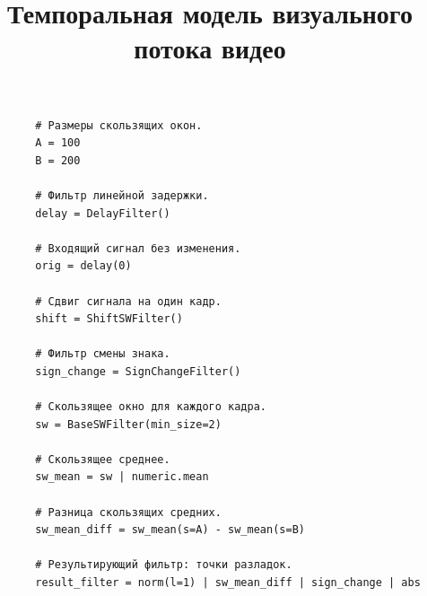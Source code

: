 \documentclass{.local/lib/classes/ndvr-vector-image-standalone}
\title[NDVR thesis-abstract]{%
    Темпоральная модель визуального потока видео%
}
\begin{document}
    \begin{verbatim}
        # Размеры скользящих окон.
        A = 100
        B = 200

        # Фильтр линейной задержки.
        delay = DelayFilter()

        # Входящий сигнал без изменения.
        orig = delay(0)   

        # Сдвиг сигнала на один кадр.
        shift = ShiftSWFilter()

        # Фильтр смены знака.
        sign_change = SignChangeFilter()

        # Скользящее окно для каждого кадра.
        sw = BaseSWFilter(min_size=2)

        # Скользящее среднее. 
        sw_mean = sw | numeric.mean

        # Разница скользящих средних.
        sw_mean_diff = sw_mean(s=A) - sw_mean(s=B)

        # Результирующий фильтр: точки разладок.
        result_filter = norm(l=1) | sw_mean_diff | sign_change | abs
    \end{verbatim}
\end{document}
